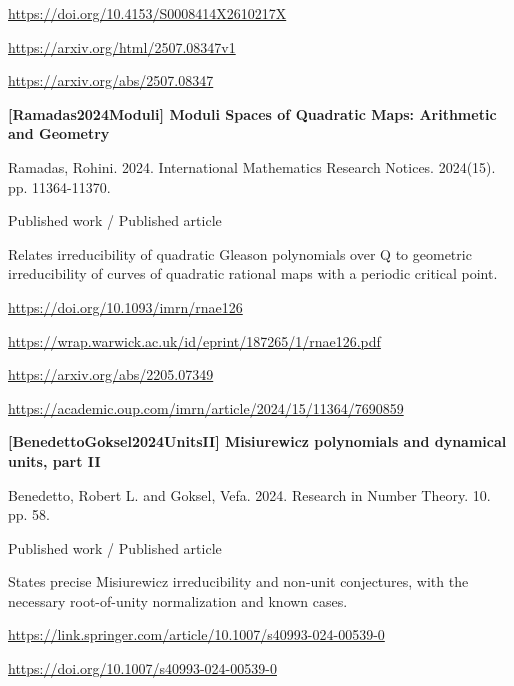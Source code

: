 \documentclass[11pt,a4paper,oneside,openany]{book}
\begin{document}
{\footnotesize\url{https://doi.org/10.4153/S0008414X2610217X}}\par
{\footnotesize\url{https://arxiv.org/html/2507.08347v1}}\par
{\footnotesize\url{https://arxiv.org/abs/2507.08347}}\par
\vspace{9pt}
\hypertarget{ref:Ramadas2024Moduli}{}
{\sffamily\bfseries\color{atlasgreen}[Ramadas2024Moduli] Moduli Spaces of Quadratic Maps: Arithmetic and Geometry}\par
\color{black} Ramadas, Rohini. 2024. International Mathematics Research Notices. 2024(15). pp. 11364-11370.\par
{\small\sffamily\color{atlasgold}Published work / Published article}\par
\color{black} Relates irreducibility of quadratic Gleason polynomials over Q to geometric irreducibility of curves of quadratic rational maps with a periodic critical point.\par
{\footnotesize\url{https://doi.org/10.1093/imrn/rnae126}}\par
{\footnotesize\url{https://wrap.warwick.ac.uk/id/eprint/187265/1/rnae126.pdf}}\par
{\footnotesize\url{https://arxiv.org/abs/2205.07349}}\par
{\footnotesize\url{https://academic.oup.com/imrn/article/2024/15/11364/7690859}}\par
\vspace{9pt}
\hypertarget{ref:BenedettoGoksel2024UnitsII}{}
{\sffamily\bfseries\color{atlasgreen}[BenedettoGoksel2024UnitsII] Misiurewicz polynomials and dynamical units, part II}\par
\color{black} Benedetto, Robert L. and Goksel, Vefa. 2024. Research in Number Theory. 10. pp. 58.\par
{\small\sffamily\color{atlasgold}Published work / Published article}\par
\color{black} States precise Misiurewicz irreducibility and non-unit conjectures, with the necessary root-of-unity normalization and known cases.\par
{\footnotesize\url{https://link.springer.com/article/10.1007/s40993-024-00539-0}}\par
{\footnotesize\url{https://doi.org/10.1007/s40993-024-00539-0}}\par
\vspace{9pt}
\hypertarget{ref:BenedettoGoksel2026NonUnit}{}
\end{document}
